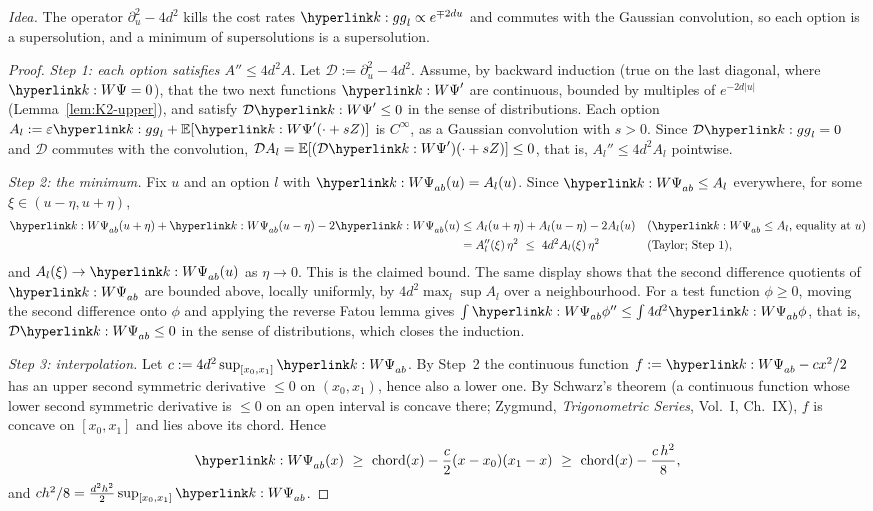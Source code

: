\documentclass[11pt]{article}
\newcommand{\E}{\mathbb{E}}
\newcommand{\1}{\mathbf{1}}
\begin{document}
\noindent\textit{Idea.} The operator $\partial_u^2-4d^2$ kills the cost rates $\kg_l\propto e^{\mp2du}$ and commutes with the Gaussian convolution, so each option is a
supersolution, and a minimum of supersolutions is a supersolution.

\begin{proof}
\textit{Step 1: each option satisfies $A''\le4d^2A$.} Let $\mathcal D:=\partial_u^2-4d^2$. Assume, by backward induction (true on the last diagonal, where $\kW=0$), that the
two next functions $\kW'$ are continuous, bounded by multiples of $e^{-2d|u|}$ (Lemma~\ref{lem:K2-upper}), and satisfy $\mathcal D\kW'\le0$ in the sense of distributions.
Each option $A_l:=\varepsilon\kg_l+\E[\kW'(\cdot+sZ)]$ is $C^\infty$, as a Gaussian convolution with $s>0$. Since $\mathcal D\kg_l=0$ and $\mathcal D$ commutes with the
convolution, $\mathcal DA_l=\E[(\mathcal D\kW')(\cdot+sZ)]\le0$, that is, $A_l''\le4d^2A_l$ pointwise.

\textit{Step 2: the minimum.} Fix $u$ and an option $l$ with $\kW_{ab}(u)=A_l(u)$. Since $\kW_{ab}\le A_l$ everywhere, for some $\xi\in(u-\eta,u+\eta)$,
\begin{align*}
\kW_{ab}(u+\eta)+\kW_{ab}(u-\eta)-2\kW_{ab}(u)
&\le A_l(u+\eta)+A_l(u-\eta)-2A_l(u) && \text{($\kW_{ab}\le A_l$, equality at $u$)}\\
&=A_l''(\xi)\,\eta^2\ \le\ 4d^2A_l(\xi)\,\eta^2 && \text{(Taylor; Step~1)},
\end{align*}
and $A_l(\xi)\to\kW_{ab}(u)$ as $\eta\to0$. This is the claimed bound. The same display shows that the second difference quotients of $\kW_{ab}$ are bounded above, locally
uniformly, by $4d^2\max_l\sup A_l$ over a neighbourhood. For a test function $\phi\ge0$, moving the second difference onto $\phi$ and applying the reverse Fatou lemma
gives $\int\kW_{ab}\phi''\le\int4d^2\kW_{ab}\phi$, that is, $\mathcal D\kW_{ab}\le0$ in the sense of distributions, which closes the induction.

\textit{Step 3: interpolation.} Let $c:=4d^2\sup_{[x_0,x_1]}\kW_{ab}$. By Step~2 the continuous function $f:=\kW_{ab}-cx^2/2$ has an upper second symmetric derivative
$\le0$ on $(x_0,x_1)$, hence also a lower one. By Schwarz's theorem (a continuous function whose lower second symmetric derivative is $\le0$ on an open interval is
concave there; Zygmund, \emph{Trigonometric Series}, Vol.~I, Ch.~IX), $f$ is concave on $[x_0,x_1]$ and lies above its chord. Hence
\[
\kW_{ab}(x)\ \ge\ \text{chord}(x)-\frac c2(x-x_0)(x_1-x)\ \ge\ \text{chord}(x)-\frac{c\,h^2}{8},
\]
and $c h^2/8=\frac{d^2h^2}2\sup_{[x_0,x_1]}\kW_{ab}$.
\end{proof}
\end{document}
